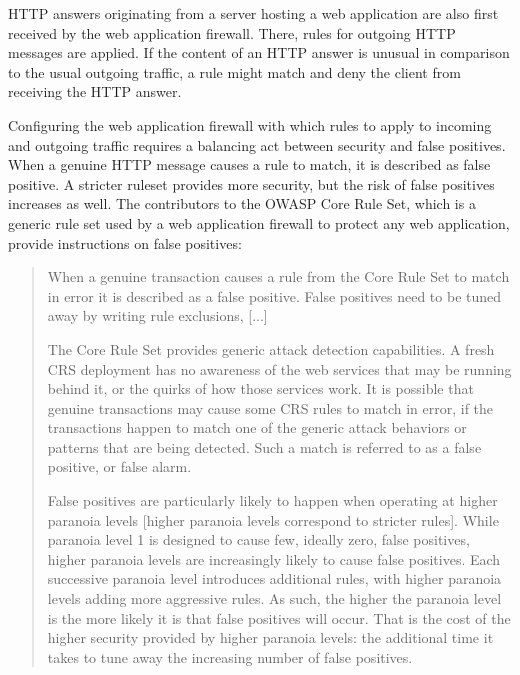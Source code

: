 HTTP answers originating from a server hosting a web application are also first received by the web application firewall.
There, rules for outgoing HTTP messages are applied.
If the content of an HTTP answer is unusual in comparison to the usual outgoing traffic, a rule might match and deny the client from receiving the HTTP answer.

Configuring the web application firewall with which rules to apply to incoming and outgoing traffic requires a balancing act between security and false positives.
When a genuine HTTP message causes a rule to match, it is described as false positive.
A stricter ruleset provides more security, but the risk of false positives increases as well.
The contributors to the OWASP Core Rule Set, which is a generic rule set used by a web application firewall to protect any web application, provide instructions on false positives:

\begin{quote}
	When a genuine transaction causes a rule from the Core Rule Set to match in error it is described as a false positive. False positives need to be tuned away by writing rule exclusions, [...]

	The Core Rule Set provides generic attack detection capabilities. A fresh CRS deployment has no awareness of the web services that may be running behind it, or the quirks of how those services work. It is possible that genuine transactions may cause some CRS rules to match in error, if the transactions happen to match one of the generic attack behaviors or patterns that are being detected. Such a match is referred to as a false positive, or false alarm.

	False positives are particularly likely to happen when operating at higher paranoia levels [higher paranoia levels correspond to stricter rules]. While paranoia level 1 is designed to cause few, ideally zero, false positives, higher paranoia levels are increasingly likely to cause false positives. Each successive paranoia level introduces additional rules, with higher paranoia levels adding more aggressive rules. As such, the higher the paranoia level is the more likely it is that false positives will occur. That is the cost of the higher security provided by higher paranoia levels: the additional time it takes to tune away the increasing number of false positives. \cite{OWASP/crsfpt}
\end{quote}

